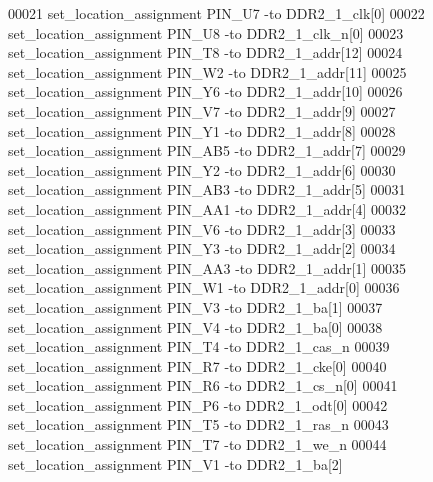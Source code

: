 \begin{DoxyCode}
00021 \textcolor{comment}{}set\_location\_assignment PIN\_U7 -to DDR2\_1\_clk[0]\textcolor{comment}{}
00022 \textcolor{comment}{}set\_location\_assignment PIN\_U8 -to DDR2\_1\_clk\_n[0]\textcolor{comment}{}
00023 \textcolor{comment}{}set\_location\_assignment PIN\_T8 -to DDR2\_1\_addr[12]\textcolor{comment}{}
00024 \textcolor{comment}{}set\_location\_assignment PIN\_W2 -to DDR2\_1\_addr[11]\textcolor{comment}{}
00025 \textcolor{comment}{}set\_location\_assignment PIN\_Y6 -to DDR2\_1\_addr[10]\textcolor{comment}{}
00026 \textcolor{comment}{}set\_location\_assignment PIN\_V7 -to DDR2\_1\_addr[9]\textcolor{comment}{}
00027 \textcolor{comment}{}set\_location\_assignment PIN\_Y1 -to DDR2\_1\_addr[8]\textcolor{comment}{}
00028 \textcolor{comment}{}set\_location\_assignment PIN\_AB5 -to DDR2\_1\_addr[7]\textcolor{comment}{}
00029 \textcolor{comment}{}set\_location\_assignment PIN\_Y2 -to DDR2\_1\_addr[6]\textcolor{comment}{}
00030 \textcolor{comment}{}set\_location\_assignment PIN\_AB3 -to DDR2\_1\_addr[5]\textcolor{comment}{}
00031 \textcolor{comment}{}set\_location\_assignment PIN\_AA1 -to DDR2\_1\_addr[4]\textcolor{comment}{}
00032 \textcolor{comment}{}set\_location\_assignment PIN\_V6 -to DDR2\_1\_addr[3]\textcolor{comment}{}
00033 \textcolor{comment}{}set\_location\_assignment PIN\_Y3 -to DDR2\_1\_addr[2]\textcolor{comment}{}
00034 \textcolor{comment}{}set\_location\_assignment PIN\_AA3 -to DDR2\_1\_addr[1]\textcolor{comment}{}
00035 \textcolor{comment}{}set\_location\_assignment PIN\_W1 -to DDR2\_1\_addr[0]\textcolor{comment}{}
00036 \textcolor{comment}{}set\_location\_assignment PIN\_V3 -to DDR2\_1\_ba[1]\textcolor{comment}{}
00037 \textcolor{comment}{}set\_location\_assignment PIN\_V4 -to DDR2\_1\_ba[0]\textcolor{comment}{}
00038 \textcolor{comment}{}set\_location\_assignment PIN\_T4 -to DDR2\_1\_cas\_n\textcolor{comment}{}
00039 \textcolor{comment}{}set\_location\_assignment PIN\_R7 -to DDR2\_1\_cke[0]\textcolor{comment}{}
00040 \textcolor{comment}{}set\_location\_assignment PIN\_R6 -to DDR2\_1\_cs\_n[0]\textcolor{comment}{}
00041 \textcolor{comment}{}set\_location\_assignment PIN\_P6 -to DDR2\_1\_odt[0]\textcolor{comment}{}
00042 \textcolor{comment}{}set\_location\_assignment PIN\_T5 -to DDR2\_1\_ras\_n\textcolor{comment}{}
00043 \textcolor{comment}{}set\_location\_assignment PIN\_T7 -to DDR2\_1\_we\_n\textcolor{comment}{}
00044 \textcolor{comment}{}set\_location\_assignment PIN\_V1 -to DDR2\_1\_ba[2]
\end{DoxyCode}
